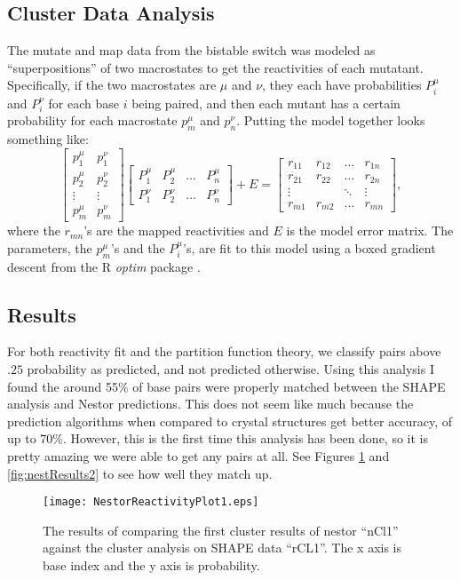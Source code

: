 \subsection{Cluster Data Analysis}

The mutate and map data from the bistable switch was modeled as
``superpositions'' of two macrostates to get the reactivities of each
mutatant. Specifically, if the two macrostates are $\mu$ and $\nu$,
they each have probabilities $P^\mu_i$ and $P^\nu_i$ for each base $i$
being paired, and then each mutant has a certain probability for each
macrostate $p^\mu_m$ and $p^\nu_n$. Putting the model together looks
something like:
\begin{equation}
\begin{bmatrix}
p^\mu_1 & p^\nu_1 \\
p^\mu_2 & p^\nu_2 \\
\vdots & \vdots \\
p^\mu_m & p^\nu_m
\end{bmatrix}
\begin{bmatrix}
P^\mu_1 & P^\mu_2 & \dots & P^\mu_n \\
P^\nu_1 & P^\nu_2 & \dots & P^\nu_n
\end{bmatrix} + E = 
\begin{bmatrix}
r_{11} & r_{12} & \dots & r_{1n} \\
r_{21} & r_{22} & \dots & r_{2n} \\
\vdots & &\ddots & \vdots \\
r_{m1} & r_{m2} & \dots & r_{mn}
\end{bmatrix},
\end{equation}
where the $r_{mn}$'s are the mapped reactivities and $E$ is the model
error matrix. The parameters, the $p^\mu_m$'s and the $P^\mu_i$'s, are
fit to this model using a boxed gradient descent from the R
\emph{optim} package \cite{byrd1995limited}.

\subsection{Results}

For both reactivity fit and the partition function theory, we classify
pairs above $.25$ probability as predicted, and not predicted
otherwise. Using this analysis I found the around 55\% of base pairs
were properly matched between the SHAPE analysis and Nestor
predictions. This does not seem like much because the prediction
algorithms when compared to crystal structures get better accuracy, of
up to 70\%. However, this is the first time this analysis has been
done, so it is pretty amazing we were able to get any pairs at
all. See Figures \ref{fig:nestResults1} and \ref{fig:nestResults2} to see
how well they match up.
\begin{figure}[t] 
\texttt{[image: NestorReactivityPlot1.eps]}
\caption{The results of comparing the first cluster results of nestor
  ``nCl1'' against the cluster analysis on SHAPE data ``rCL1''. The x
  axis is base index and the y axis is probability.}
\label{fig:nestResults1}
\end{figure}

